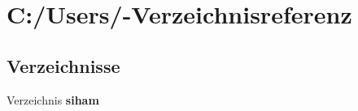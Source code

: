 \section{C:/Users/-Verzeichnisreferenz}
\label{dir_C_3A_2FUsers_2F}


\subsection*{Verzeichnisse}
\begin{CompactItemize}
\item 
Verzeichnis {\bf siham}
\end{CompactItemize}
